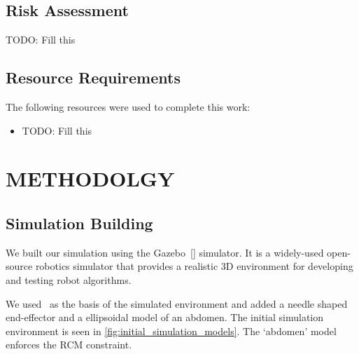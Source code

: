 \documentclass[BTech]{iitmdiss}
\begin{document}
    \section{Risk Assessment}

    TODO: Fill this


    \section{Resource Requirements}
    The following resources were used to complete this work:
    \begin{itemize}
        \item TODO: Fill this
    \end{itemize}


    \chapter{METHODOLGY}\label{ch:method}


    \section{Simulation Building}

    We built our simulation using the Gazebo~[\cite{gazebo-url}] simulator.
    It is a widely-used open-source robotics simulator that provides a realistic 3D environment for developing and testing robot algorithms.

    We used~\cite{hennersperger2017towards} as the basis of the simulated environment and added a needle shaped end-effector and a ellipsoidal model of an abdomen.
    The initial simulation environment is seen in \ref{fig:initial_simulation_models}.
    The `abdomen' model enforces the RCM constraint.
\end{document}
